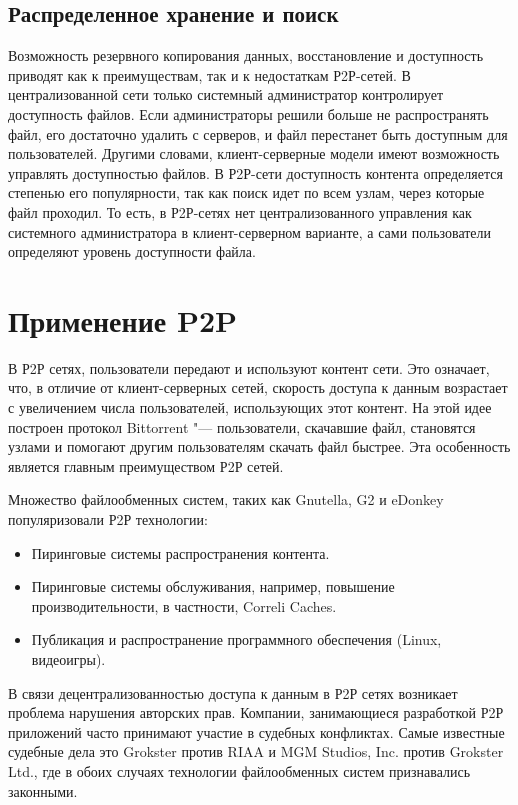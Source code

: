 \documentclass[bachelor, och, coursework]{SCWorks}
\begin{document}
\subsection{Распределенное хранение и поиск}
Возможность резервного копирования данных, восстановление и доступность приводят как к преимуществам, так и к недостаткам Р2Р-сетей. 
В централизованной сети только системный администратор контролирует доступность файлов. 
Если администраторы решили больше не распространять файл, его достаточно удалить с серверов,
и файл перестанет быть доступным для пользователей. Другими словами, клиент-серверные модели имеют возможность управлять доступностью файлов. В Р2Р-сети доступность контента определяется степенью его популярности, так как поиск идет по всем узлам, через которые файл проходил. 
То есть, в Р2Р-сетях нет централизованного управления как системного администратора в клиент-серверном варианте, 
а сами пользователи определяют уровень доступности файла.

\section{Применение P2P}
В Р2Р сетях, пользователи передают и используют контент сети. Это означает, что, в отличие от клиент-серверных сетей, 
скорость доступа к данным возрастает с увеличением числа пользователей, использующих этот контент. 
На этой идее построен протокол Bittorrent "--- пользователи, скачавшие файл, становятся узлами и помогают другим пользователям скачать файл быстрее. 
Эта особенность является главным преимуществом Р2Р сетей.

Множество файлообменных систем, таких как Gnutella, G2 и eDonkey популяризовали Р2Р технологии:
\begin{itemize}
    \item Пиринговые системы распространения контента.
    \item Пиринговые системы обслуживания, например, повышение производительности, в частности, Correli Caches.
    \item Публикация и распространение программного обеспечения (Linux, видеоигры).
\end{itemize}

В связи децентрализованностью доступа к данным в Р2Р сетях возникает проблема нарушения авторских прав. 
Компании, занимающиеся разработкой Р2Р приложений часто принимают участие в судебных конфликтах. 
Самые известные судебные дела это Grokster против RIAA и MGM Studios, Inc. против Grokster Ltd., 
где в обоих случаях технологии файлообменных систем признавались законными.
\end{document}
